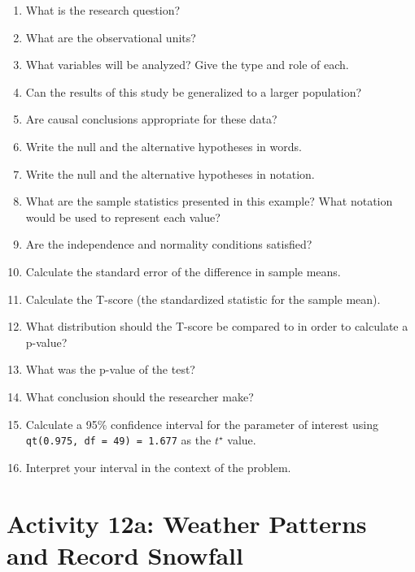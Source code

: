 \documentclass[
]{report}
\newcommand{\rgs}{\vspace{12pt}} %
\begin{document}
\begin{enumerate}
\def\labelenumi{\arabic{enumi}.}
\item
  What is the research question?
  \rgs
\item
  What are the observational units?
  \rgs
\item
  What variables will be analyzed? Give the type and role of each.
  \rgs
  \rgs
\item
  Can the results of this study be generalized to a larger population?
  \rgs
\item
  Are causal conclusions appropriate for these data?
  \rgs
\item
  Write the null and the alternative hypotheses in words.
  \rgs
  \rgs
\item
  Write the null and the alternative hypotheses in notation.
  \rgs
\item
  What are the sample statistics presented in this example? What notation would be used to represent each value?
  \rgs
\item
  Are the independence and normality conditions satisfied?
  \rgs
  \rgs
\item
  Calculate the standard error of the difference in sample means.
  \rgs
  \rgs
\item
  Calculate the T-score (the standardized statistic for the sample mean).
  \rgs
  \rgs
\item
  What distribution should the T-score be compared to in order to calculate a p-value?
  \rgs
\item
  What was the p-value of the test?
  \rgs
\item
  What conclusion should the researcher make?
  \rgs
  \rgs
\item
  Calculate a 95\% confidence interval for the parameter of interest using \texttt{qt(0.975,\ df\ =\ 49)\ =\ 1.677} as the \(t^\star\) value.
  \rgs
  \rgs
\item
  Interpret your interval in the context of the problem.
  \rgs
  \rgs
\end{enumerate}

\newpage

\hypertarget{activity-12a-weather-patterns-and-record-snowfall}{%
\section{Activity 12a: Weather Patterns and Record Snowfall}\label{activity-12a-weather-patterns-and-record-snowfall}}

\end{document}
